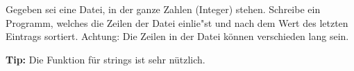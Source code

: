 \begin{aufg}
 Gegeben sei eine Datei, in der ganze Zahlen (Integer) stehen.
 Schreibe ein Programm, welches die Zeilen der Datei einlie"st und 
 nach dem Wert des letzten Eintrags sortiert.
 Achtung: Die Zeilen in der Datei können verschieden lang sein.
 
 \textbf{Tip:} Die Funktion  für strings ist sehr nützlich.
\end{aufg}

